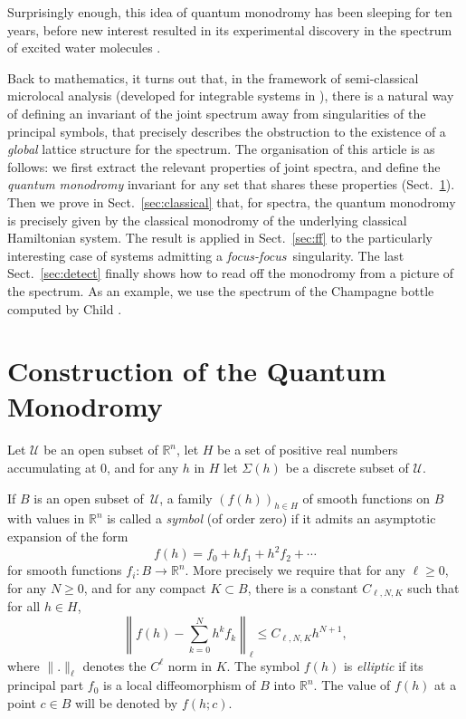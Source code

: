 \documentclass[cmp]{svjour}  %
\newcommand{\fleche}{\rightarrow}
\newcommand{\RM}{\mathbb{R}}
\newcommand{\ff}{\emph{focus-focus}}
\newcommand{\U}{\mathcal{U}}
\begin{document}
Surprisingly enough, this idea of quantum monodromy has been sleeping
for ten years, before new interest resulted in its experimental
discovery in the spectrum of excited water molecules
\cite{child,tennyson}.


Back to mathematics, it turns out that, in the framework of
semi-classical microlocal analysis (developed for integrable systems
in \cite{charbonnel}), there is a natural way of defining an invariant
of the joint spectrum away from singularities of the principal
symbols, that precisely describes the obstruction to the existence of
a \emph{global} lattice structure for the spectrum. The organisation
of this article is as follows: we first extract the relevant
properties of joint spectra, and define the \emph{quantum monodromy}
invariant for any set that shares these properties
(Sect.~\ref{sec:construction}). Then we prove in Sect.~\ref{sec:classical}
that, for spectra, the quantum monodromy is precisely given by the
classical monodromy of the underlying classical Hamiltonian system.
The result is applied in Sect.~\ref{sec:ff} to the particularly
interesting case of systems admitting a \ff\ singularity. The last
Sect.~\ref{sec:detect} finally shows how to read off the monodromy
from a picture of the spectrum. As an example, we use the spectrum of
the Champagne bottle computed by Child \cite{child}.

\section{Construction of the Quantum Monodromy}
\label{sec:construction}
Let $\U$ be an open subset of $\RM^n$, let $H$ be a set of positive
real numbers accumulating at $0$, and for any $h$ in $H$ let
$\Sigma(h)$ be a discrete subset of $\U$.

If $B$ is an open subset of\  $\U$, a family $(f(h))_{h\in H}$ of smooth
functions on $B$ with values in $\RM^n$ is called a \emph{symbol} (of
order zero) if it admits an asymptotic expansion of the form
\[ f(h) = f_0 + hf_1 + h^2f_2 +\cdots \]
for smooth functions $f_i : B\fleche\RM^n$. More precisely we require
that for any $\ell\geq 0$, for any $N\geq 0$, and for any compact
$K\subset B$, there is a constant $C_{\ell,N,K}$ such that for all
$h\in H$,
\[ \left\| f(h)-\sum_{k=0}^N h^kf_k \right\|_\ell \leq C_{\ell,N,K}h^{N+1},\]
where $\|.\|_\ell$ denotes the $C^\ell$ norm in $K$.  The symbol $f(h)$
is \emph{elliptic} if its principal part $f_0$ is a local
diffeomorphism of $B$ into $\RM^n$. The value of $f(h)$ at a point
$c\in B$ will be denoted by $f(h;c)$.
\end{document}
